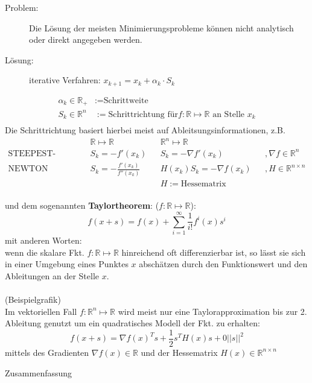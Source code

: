 \begin{description}
	\item[Problem:] Die Lösung der meisten Minimierungsprobleme können nicht analytisch oder direkt angegeben werden.
	\item[Lösung:] iterative Verfahren: $x_{k+1}=x_k + \alpha_k \cdot S_k$
\end{description}
\begin{align*}
	\alpha_k \in \mathbb{R}_+ &:= \text{Schrittweite}\\
	S_k \in \mathbb{R}^n&:= \text{Schrittrichtung für} f: \mathbb{R} \mapsto \mathbb{R} \text{ an Stelle } x_k\\
\end{align*}
Die Schrittrichtung basiert hierbei meist auf Ableitsungsinformationen, z.B.
\begin{align*}
	& \mathbb{R} \mapsto \mathbb{R} && \mathbb{R}^n \mapsto \mathbb{R}\\
	\text{STEEPEST-DESCENT } & S_k = -f'(x_k) && S_k = -\nabla f'(x_k) && ,\nabla f \in \mathbb{R}^n\\
	\text{NEWTON  } & S_k=-\frac{f'(x_k)}{f''(x_k)} && H(x_k) S_k = -\nabla f(x_k) && ,H \in \mathbb{R}^{n \times n}\\
	& && H := \text{Hessematrix}	
\end{align*}
\\
\noindent und dem sogenannten \textbf{Taylortheorem}: ($f: \mathbb{R} \mapsto \mathbb{R}$):\\
$$f(x+s) = f(x) + \sum_{i=1}^{\infty} \frac{1}{i!}f^i(x)s^i$$
mit anderen Worten:\\
wenn die skalare Fkt. $f: \mathbb{R} \mapsto \mathbb{R}$ hinreichend oft differenzierbar ist, so lässt sie sich in einer Umgebung eines Punktes $x$ abschätzen durch den Funktionswert und den Ableitungen an der Stelle $x$.\\
\vspace{3cm}\\
(Beispielgrafik)\\

\noindent Im vektoriellen Fall $f: \mathbb{R}^n \mapsto \mathbb{R}$ wird meist nur eine Taylorapproximation bis zur 2. Ableitung genutzt um ein quadratisches Modell der Fkt. zu erhalten:
$$f(x+s) = \nabla f(x)^Ts + \frac{1}{2} s^TH(x)s + 0||s||^2$$
mittels des Gradienten $\nabla f(x) \in \mathbb{R}$ und der Hessematrix $H(x) \in \mathbb{R}^{n \times n}$

Zusammenfassung

